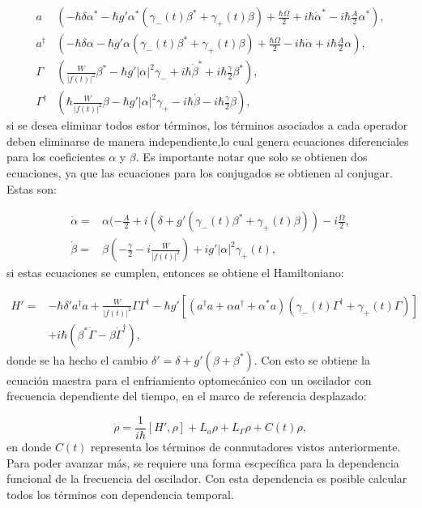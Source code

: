 \documentclass[a4paper,10pt]{report}
\begin{document}
\begin{align}
a&(-\hbar\delta\alpha^* -\hbar g' \alpha^*(\gamma_-(t) \beta^* + \gamma_+(t) \beta)+ \frac{\hbar\Omega}{2} + i\hbar\dot{\alpha}^* -i\hbar\frac{A}{2}\alpha^*),\\
a^\dagger&(-\hbar\delta\alpha -\hbar g' \alpha(\gamma_-(t) \beta^* + \gamma_+(t) \beta)+ \frac{\hbar\Omega}{2} - i\hbar\dot{\alpha} +i\hbar\frac{A}{2}\alpha),\\
\Gamma&(\frac{W}{|f(t)|^2}\beta^*-\hbar g'|\alpha|^2\gamma_- +  i\hbar\dot{\beta}^*+i\hbar\frac{\gamma}{2}\beta^*),\\
\Gamma^\dagger&(\hbar\frac{W}{|f(t)|^2}\beta-\hbar g'|\alpha|^2\gamma_+ -  i\hbar\dot{\beta}-i\hbar\frac{\gamma}{2}\beta),
\end{align} si se desea eliminar todos estor términos, los términos asociados a cada operador deben eliminarse de manera independiente,lo cual genera ecuaciones diferenciales para los coeficientes $\alpha$ y $\beta$. Es importante notar que solo se obtienen dos ecuaciones, ya que las ecuaciones para los conjugados se obtienen al conjugar. Estas son:

\begin{align}
\dot{\alpha} =& \alpha(-\frac{A}{2}+i(\delta+g'(\gamma_-(t) \beta^* + \gamma_+(t) \beta))-i\frac{\Omega}{2},\\
\dot{\beta} =& \beta(-\frac{\gamma}{2}-i\frac{W}{|f(t)|^2})+ig'|\alpha|^2\gamma_+(t),
\end{align} si estas ecuaciones se cumplen, entonces se obtiene el Hamiltoniano:


\begin{align*}
H'=& -\hbar \delta' a^\dagger a + \frac{W}{|f(t)|^2}\Gamma \Gamma^\dagger -\hbar g'[(a^{\dagger}a +\alpha a^{\dagger}+\alpha^* a)(\gamma_-(t)\Gamma^{\dagger}+\gamma_+(t)\Gamma)]\\
&+ i\hbar(\beta^*\dot{\Gamma} - \beta \dot{\Gamma}^\dagger),
\end{align*}  donde se ha hecho el cambio $\delta' = \delta + g'(\beta + \beta^*)$. Con esto se obtiene la ecuación maestra para el enfriamiento optomecánico con un oscilador con frecuencia dependiente del tiempo, en el marco de referencia desplazado:

\begin{equation}\label{DLCMasterEquation}
\dot{\rho} = \frac{1}{i\hbar}[H',\rho] + L_a\rho + L_\Gamma\rho + C(t)\rho,
\end{equation} en donde $C(t)$ representa los términos de conmutadores vistos anteriormente. Para poder avanzar más, se requiere una forma escpecífica para la dependencia funcional de la frecuencia del oscilador. Con esta dependencia es posible calcular todos los términos con dependencia temporal.
\end{document}
